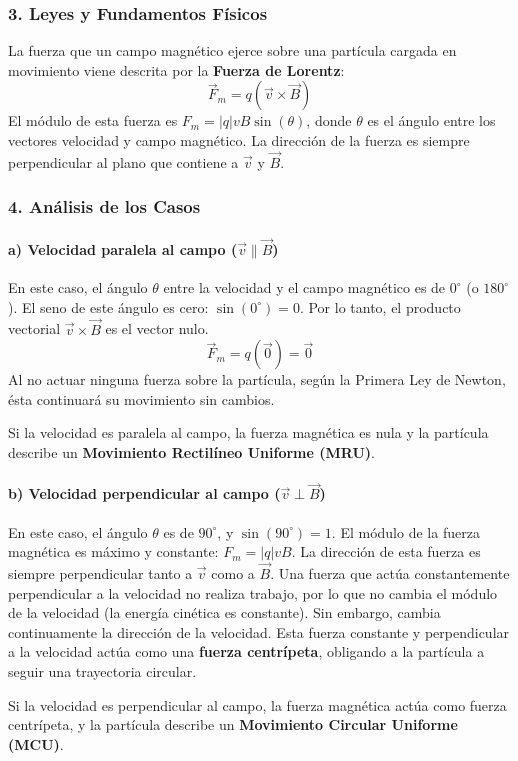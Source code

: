 \subsubsection*{3. Leyes y Fundamentos Físicos}
La fuerza que un campo magnético ejerce sobre una partícula cargada en movimiento viene descrita por la \textbf{Fuerza de Lorentz}:
$$ \vec{F}_m = q (\vec{v} \times \vec{B}) $$
El módulo de esta fuerza es $F_m = |q|vB\sin(\theta)$, donde $\theta$ es el ángulo entre los vectores velocidad y campo magnético. La dirección de la fuerza es siempre perpendicular al plano que contiene a $\vec{v}$ y $\vec{B}$.

\subsubsection*{4. Análisis de los Casos}
\paragraph*{a) Velocidad paralela al campo ($\vec{v} \parallel \vec{B}$)}
En este caso, el ángulo $\theta$ entre la velocidad y el campo magnético es de $0^\circ$ (o $180^\circ$). El seno de este ángulo es cero: $\sin(0^\circ) = 0$.
Por lo tanto, el producto vectorial $\vec{v} \times \vec{B}$ es el vector nulo.
$$ \vec{F}_m = q(\vec{0}) = \vec{0} $$
Al no actuar ninguna fuerza sobre la partícula, según la Primera Ley de Newton, ésta continuará su movimiento sin cambios.
\begin{cajaresultado}
Si la velocidad es paralela al campo, la fuerza magnética es nula y la partícula describe un \textbf{Movimiento Rectilíneo Uniforme (MRU)}.
\end{cajaresultado}

\paragraph*{b) Velocidad perpendicular al campo ($\vec{v} \perp \vec{B}$)}
En este caso, el ángulo $\theta$ es de $90^\circ$, y $\sin(90^\circ)=1$. El módulo de la fuerza magnética es máximo y constante: $F_m = |q|vB$.
La dirección de esta fuerza es siempre perpendicular tanto a $\vec{v}$ como a $\vec{B}$. Una fuerza que actúa constantemente perpendicular a la velocidad no realiza trabajo, por lo que no cambia el módulo de la velocidad (la energía cinética es constante). Sin embargo, cambia continuamente la dirección de la velocidad.
Esta fuerza constante y perpendicular a la velocidad actúa como una \textbf{fuerza centrípeta}, obligando a la partícula a seguir una trayectoria circular.
\begin{cajaresultado}
Si la velocidad es perpendicular al campo, la fuerza magnética actúa como fuerza centrípeta, y la partícula describe un \textbf{Movimiento Circular Uniforme (MCU)}.
\end{cajaresultado}

